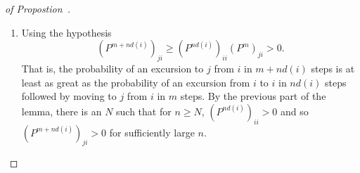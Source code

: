 \documentclass[12pt]{article}
\begin{document}
\begin{proof}[of Propostion~\ref
    {prop:stationarydistributions:communicating}]
\begin{enumerate}
\begin{enumerate}
                    > 0 \).
                \item
                    Let \( n_j = m_{ij} + m_{ji} \).  Then
                    \[
                        (P^{n_j})_{ii} = (P^{m_{ij} + m_{ji}})_{ii} \ge
                        (P^{m_{ij}})_{ij } (P^{m_{ji}})_{ji} > 0.
                    \] That is, the probability of a return to \( i \)
                    from \( i \) in \( n_j \) steps is at least as great
                    as the probability of an excursion from \( i \) to \(
                    j \) in \( m_{ij} \) steps with return to \( i \)
                    from \( j \) in \( m_{ji} \) steps.
                \item
                    Using the Markov property of independence of the
                    past and the future given the present state, \( (P^{n_j})_
                    {ii} > 0 \) implies that for any positive integer \(
                    c_j \), \( (P^{c_j n_j})_ {ii} > 0 \), that is, the
                    probability of \( c_j \) sequential returns is still
                    positive.
                \item
                    By the number theoretic Lemma~%
                    \ref{lem:stationarydistributions:numtheory}, there
                    exists \( N \) and positive integers \( c_1, \dots,
                    c_k \) such that if \( n \ge N \)
                    \[
                        (P^{n d(i)})_{ii} = (P^{c_1 n_1 + \cdots + c_k n_k})_
                        {ii} \ge (P^{c_1 n_1})_{ii} \cdot \dots \cdot (P^
                        {c_k n_k})_{ii} >0.
                    \]
            \end{enumerate}
        \item
            Using the hypothesis
            \[
                (P^{m + n d(i)})_{ji} \ge (P^{n d(i)})_{ii} (P^m)_{ji} >
                0.
            \] That is, the probability of an excursion to \( j \) from \(
            i \) in \( m + n d(i) \) steps is at least as great as the
            probability of an excursion from \( i \) to \( i \) in \( n
            d(i) \) steps followed by moving to \( j \) from \( i \) in \(
            m \) steps.  By the previous part of the lemma, there is an \(
            N \) such that for \( n \ge N \), \( (P^{n d(i)})_{ii} > 0 \)
            and so \( (P^{m + n d(i)})_{ji} >0 \) for sufficiently large
            \( n \).
    \end{enumerate}
\end{proof}
\end{document}

